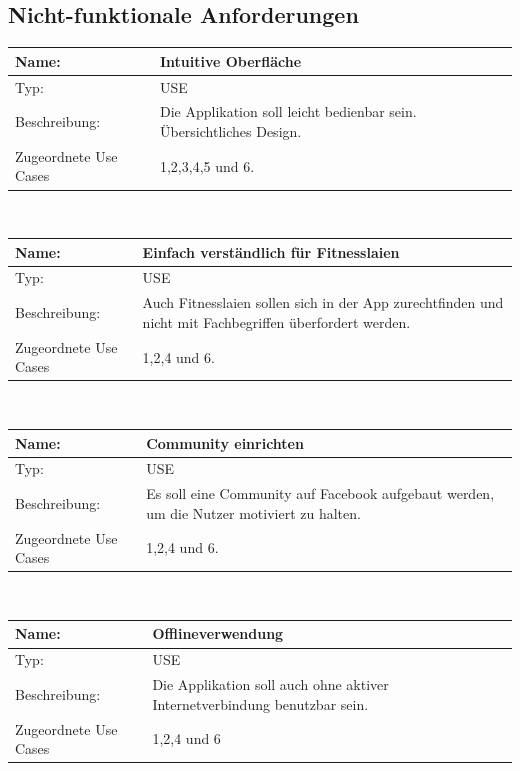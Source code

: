 \documentclass[FIPLY_base.tex]{subfiles}
\begin{document}
	\newpage
	\subsection{Nicht-funktionale Anforderungen}
	\begin{center}
		\def\arraystretch{1.3}%
		\begin{tabular}{| p{5cm} | p{5cm} |}
			\hline
			Name: & Intuitive Oberfläche \\ \hline 
			Typ: & USE \\ \hline
			Beschreibung: & Die Applikation soll leicht bedienbar sein. Übersichtliches Design. \\ \hline
			Zugeordnete Use Cases & 1,2,3,4,5 und 6.  \\ \hline
		\end{tabular} \\
	\end{center}
	\begin{center}
		\def\arraystretch{1.3}%
		\begin{tabular}{| p{5cm} | p{5cm} |}
			\hline
			Name: & Einfach verständlich für Fitnesslaien \\ \hline 
			Typ: & USE \\ \hline
			Beschreibung: & Auch Fitnesslaien sollen sich in der App zurechtfinden und nicht mit Fachbegriffen überfordert werden. \\ \hline
			Zugeordnete Use Cases & 1,2,4 und 6.  \\ \hline
		\end{tabular} \\
	\end{center}
	\begin{center}
		\def\arraystretch{1.3}%
		\begin{tabular}{| p{5cm} | p{5cm} |}
			\hline
			Name: & Community einrichten \\ \hline 
			Typ: & USE \\ \hline
			Beschreibung: & Es soll eine Community auf Facebook aufgebaut werden, um die Nutzer motiviert zu halten. \\ \hline
			Zugeordnete Use Cases & 1,2,4 und 6.  \\ \hline
		\end{tabular} \\
	\end{center}
	\begin{center}
		\def\arraystretch{1.3}%
		\begin{tabular}{| p{5cm} | p{5cm}  |}
			\hline
			Name: & Offlineverwendung \\ \hline 
			Typ: & USE \\ \hline
			Beschreibung: & Die Applikation soll auch ohne aktiver   Internetverbindung benutzbar sein. \\ \hline
			Zugeordnete Use Cases & 1,2,4 und 6  \\ \hline
		\end{tabular} \\
	\end{center}
	\ \\
\end{document}
